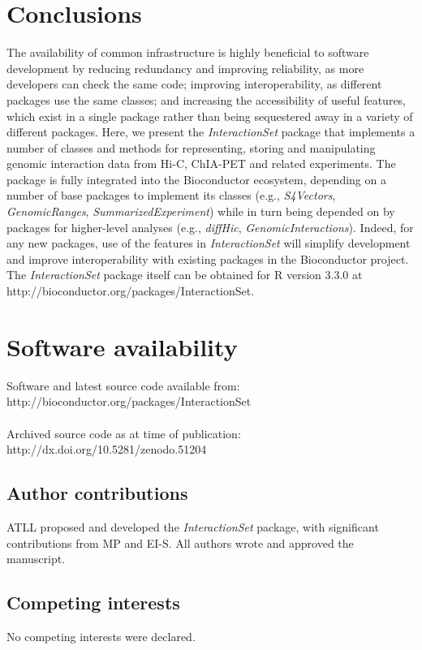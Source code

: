 \documentclass[10pt,a4paper,twocolumn]{article}
\begin{document}
\section*{Conclusions}
The availability of common infrastructure is highly beneficial to software development by reducing redundancy and improving reliability, as more developers can check the same code;
improving interoperability, as different packages use the same classes; and increasing the accessibility of useful features, which exist in a single package rather than being sequestered away in a variety of different packages.
Here, we present the \textit{InteractionSet} package that implements a number of classes and methods for representing, storing and manipulating genomic interaction data from Hi-C, ChIA-PET and related experiments.
The package is fully integrated into the Bioconductor ecosystem, depending on a number of base packages to implement its classes (e.g., \textit{S4Vectors}, \textit{GenomicRanges}, \textit{SummarizedExperiment}) while in turn being depended on by packages for higher-level analyses (e.g., \textit{diffHic}, \textit{GenomicInteractions}).
Indeed, for any new packages, use of the features in \textit{InteractionSet} will simplify development and improve interoperability with existing packages in the Bioconductor project.
The \textit{InteractionSet} package itself can be obtained for R version 3.3.0 at {http://bioconductor.org/packages/InteractionSet}.

\section*{Software availability}
Software and latest source code available from: \\
{http://bioconductor.org/packages/InteractionSet}\\
\\Archived source code as at time of publication:\\
{http://dx.doi.org/10.5281/zenodo.51204}

\subsection*{Author contributions}
ATLL proposed and developed the \textit{InteractionSet} package, with significant contributions from MP and EI-S.
All authors wrote and approved the manuscript.

\subsection*{Competing interests}
No competing interests were declared.
\end{document}
